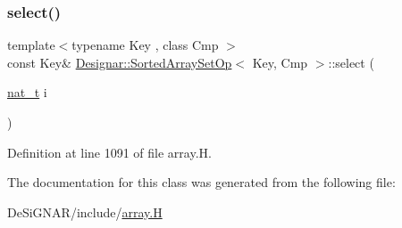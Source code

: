 \subsubsection{\texorpdfstring{select()}{select()}}
{\footnotesize\ttfamily template$<$typename Key , class Cmp $>$ \\
const Key\& \hyperlink{class_designar_1_1_sorted_array_set_op}{Designar\+::\+Sorted\+Array\+Set\+Op}$<$ Key, Cmp $>$\+::select (\begin{DoxyParamCaption}\item[{\hyperlink{namespace_designar_aa72662848b9f4815e7bf31a7cf3e33d1}{nat\+\_\+t}}]{i }\end{DoxyParamCaption})\hspace{0.3cm}{\ttfamily [inline]}}



Definition at line 1091 of file array.\+H.



The documentation for this class was generated from the following file\+:\begin{DoxyCompactItemize}
\item 
De\+Si\+G\+N\+A\+R/include/\hyperlink{array_8_h}{array.\+H}\end{DoxyCompactItemize}
